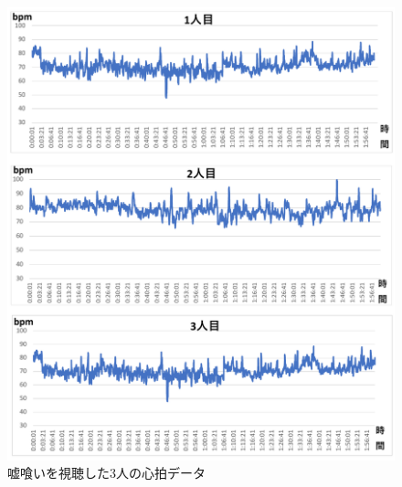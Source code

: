 \begin{figure}[H]
    \centering
    \includegraphics[width=14cm]{images/chapter4/usogui.pdf}
    \caption{嘘喰いを視聴した3人の心拍データ}
    \label{usogui}
\end{figure}
